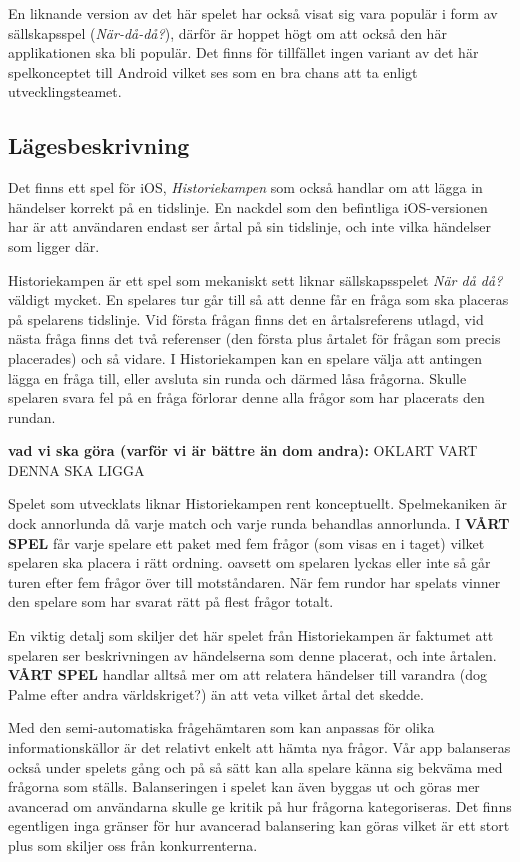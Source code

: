 \documentclass[12pt,a4paper]{article}
\begin{document}
En liknande version av det här spelet har också visat sig vara populär i form av sällskapsspel (\textit{När-då-då?})\cite{nardada}, därför är hoppet högt om att också den här applikationen ska bli populär. Det finns för tillfället ingen variant av det här spelkonceptet till Android vilket ses som en bra chans att ta enligt utvecklingsteamet.

\subsection{Lägesbeskrivning}
Det finns ett spel för iOS, \textit{Historiekampen}\cite{historiekampen} som också handlar om att lägga in händelser korrekt på en tidslinje. En nackdel som den befintliga iOS-versionen har är att användaren endast ser årtal på sin tidslinje, och inte vilka händelser som ligger där.

Historiekampen är ett spel som mekaniskt sett liknar sällskapsspelet \textit{När då då?} väldigt mycket. En spelares tur går till så att denne får en fråga som ska placeras på spelarens tidslinje. Vid första frågan finns det en årtalsreferens utlagd, vid nästa fråga finns det två referenser (den första plus årtalet för frågan som precis placerades) och så vidare. I Historiekampen kan en spelare välja att antingen lägga en fråga till, eller avsluta sin runda och därmed låsa frågorna. Skulle spelaren svara fel på en fråga förlorar denne alla frågor som har placerats den rundan.

\textbf{vad vi ska göra (varför vi är bättre än dom andra):} 
OKLART VART DENNA SKA LIGGA

Spelet som utvecklats liknar Historiekampen rent konceptuellt. Spelmekaniken är dock annorlunda då varje match och varje runda behandlas annorlunda. I \textbf{VÅRT SPEL} får varje spelare ett paket med fem frågor (som visas en i taget) vilket spelaren ska placera i rätt ordning. oavsett om spelaren lyckas eller inte så går turen efter fem frågor över till motståndaren. När fem rundor har spelats vinner den spelare som har svarat rätt på flest frågor totalt. 

En viktig detalj som skiljer det här spelet från Historiekampen är faktumet att spelaren ser beskrivningen av händelserna som denne placerat, och inte årtalen. \textbf{VÅRT SPEL} handlar alltså mer om att relatera händelser till varandra (dog Palme efter andra världskriget?) än att veta vilket årtal det skedde.

Med den semi-automatiska frågehämtaren som kan anpassas för olika informationskällor är det relativt enkelt att hämta nya frågor. Vår app balanseras också under spelets gång och på så sätt kan alla spelare känna sig bekväma med frågorna som ställs. Balanseringen i spelet kan även byggas ut och göras mer avancerad om användarna skulle ge kritik på hur frågorna kategoriseras. Det finns egentligen inga gränser för hur avancerad balansering kan göras vilket är ett stort plus som skiljer oss från konkurrenterna.
\end{document}

